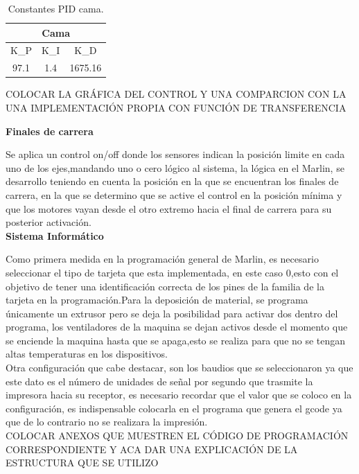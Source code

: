 \begin{table}[H]
\begin{center}
\begin{tabular}{ c c c}
\multicolumn{3}{c}{\textbf{Cama}} \\
\toprule[0.6mm]
K_P & K_I & K_D\\
\midrule
97.1 & 1.4 & 1675.16 \\ 
\bottomrule[0.6mm]
\end{tabular}
\caption{Constantes PID cama.}
\label{tabla:cama}
\end{center}
\end{table}

COLOCAR LA GRÁFICA DEL CONTROL Y UNA COMPARCION CON LA UNA IMPLEMENTACIÓN PROPIA CON FUNCIÓN DE TRANSFERENCIA


\textbf{Finales de carrera}

Se aplica un control on/off donde los sensores indican la posición limite en cada uno de los ejes,mandando uno o cero lógico al sistema, la lógica en el Marlin, se desarrollo teniendo en cuenta la posición en la que se encuentran los finales de carrera, en la que se determino que se active el control en la posición mínima y que los motores vayan desde el otro extremo hacia el final de carrera para su posterior activación.  \\

\textbf{Sistema Informático}

Como primera medida en la programación general de Marlin, es necesario seleccionar el tipo de tarjeta que esta implementada, en este caso 0,esto con el objetivo de tener una identificación correcta de los pines de la familia de la tarjeta en la programación.Para la deposición de material, se programa únicamente un extrusor pero se deja la posibilidad para activar dos dentro del programa, los ventiladores de la maquina se dejan activos desde el momento que se enciende la maquina hasta que se apaga,esto se realiza para que no se tengan altas temperaturas en los dispositivos. \\

Otra configuración que cabe destacar, son los baudios que se seleccionaron ya que este dato es el número de unidades de señal por segundo que trasmite la impresora hacia su receptor, es necesario recordar que el valor que se coloco en la configuración, es indispensable colocarla en el programa que genera el gcode ya que de lo contrario no se realizara la impresión.\\

COLOCAR ANEXOS QUE MUESTREN EL CÓDIGO DE PROGRAMACIÓN CORRESPONDIENTE Y ACA DAR UNA EXPLICACIÓN DE LA ESTRUCTURA QUE SE UTILIZO\\


